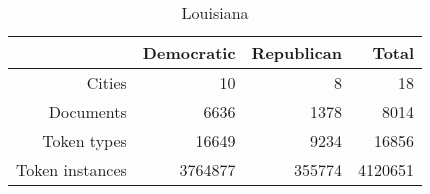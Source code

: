 \begin{table}[ht]
\centering
\begin{tabular}{rrrr}
  \hline
 & Democratic & Republican & Total \\ 
  \hline
Cities & 10 & 8 & 18 \\ 
  Documents & 6636 & 1378 & 8014 \\ 
  Token types & 16649 & 9234 & 16856 \\ 
  Token instances & 3764877 & 355774 & 4120651 \\ 
   \hline
\end{tabular}
\caption{Louisiana} 
\end{table}

